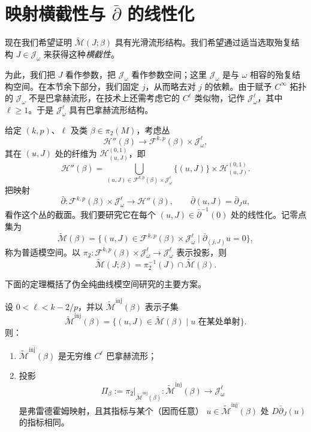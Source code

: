 \section{\texorpdfstring{映射横截性与 $\bar\partial$ 的线性化}{映射横截性与柯西--黎曼算子的线性化}}
\label{sec:mapping-transversality-linearization}
\setcounter{equation}{6}

现在我们希望证明 $\widetilde{\mathcal M}(J;\beta)$ 具有光滑流形结构。我们希望通过适当选取殆复结构
$J\in\mathcal J_\omega$ 来获得这种\emph{横截性}。

为此，我们把 $J$ 看作参数，把 $\mathcal J_\omega$ 看作参数空间；这里
$\mathcal J_\omega$ 是与 $\omega$ 相容的殆复结构空间。在本节余下部分，我们固定 $j$，从而略去对
$j$ 的依赖。由于赋予 $C^\infty$ 拓扑的 $\mathcal J_\omega$ 不是巴拿赫流形，在技术上还需考虑它的
$C^\ell$ 类似物，记作 $\mathcal J_\omega^\ell$，其中 $\ell\geq1$。于是
$\mathcal J_\omega^\ell$ 具有巴拿赫流形结构。

给定 $(k,p)$、$\ell$ 及类 $\beta\in\pi_2(M)$，考虑丛
\[
 \mathcal H''(\beta)\longrightarrow
 \mathcal F^{k,p}(\beta)\times\mathcal J_\omega^\ell,
\]
其在 $(u,J)$ 处的纤维为 $\mathcal H_{(u,J)}^{(0,1)}$，即
\[
 \mathcal H''(\beta)=
 \bigcup_{(u,J)\in\mathcal F^{k,p}(\beta)\times\mathcal J_\omega^\ell}
 \{(u,J)\}\times\mathcal H_{(u,J)}^{(0,1)}.
\]
把映射
\[
 \bar\partial:\mathcal F^{k,p}(\beta)\times\mathcal J_\omega^\ell
 \longrightarrow\mathcal H''(\beta),
 \qquad \bar\partial(u,J)=\bar\partial_Ju,
\]
看作这个丛的截面。我们要研究它在每个
$(u,J)\in\bar\partial^{-1}(0)$ 处的线性化。记零点集为
\[
 \widetilde{\mathcal M}(\beta)=
 \{(u,J)\in\mathcal F^{k,p}(\beta)\times\mathcal J_\omega^\ell
 \mid \bar\partial_{(j,J)}u=0\},
\]
称为普适模空间。以
$\pi_2:\mathcal F^{k,p}(\beta)\times\mathcal J_\omega^\ell
\to\mathcal J_\omega^\ell$ 表示投影，则
\[
 \widetilde{\mathcal M}(J;\beta)=\pi_2^{-1}(J)\cap
 \widetilde{\mathcal M}(\beta).
\]

下面的定理概括了伪全纯曲线模空间研究的主要方案。

\begin{theorem}\label{thm:mapping-transversality-main}
设 $0<\ell<k-2/p$，并以
$\widetilde{\mathcal M}^{\mathrm{inj}}(\beta)$ 表示子集
\[
 \widetilde{\mathcal M}^{\mathrm{inj}}(\beta)=
 \{(u,J)\in\widetilde{\mathcal M}(\beta)
 \mid u\text{ 在某处单射}\}.
\]
则：
\begin{enumerate}[label=(\arabic*)]
 \item $\widetilde{\mathcal M}^{\mathrm{inj}}(\beta)$ 是无穷维 $C^\ell$ 巴拿赫流形；
 \item 投影
 \[
  \Pi_\beta:=\left.\pi_2\right|_{\widetilde{\mathcal M}^{\mathrm{inj}}(\beta)}:
  \widetilde{\mathcal M}^{\mathrm{inj}}(\beta)\longrightarrow\mathcal J_\omega^\ell
 \]
 是弗雷德霍姆映射，且其指标与某个（因而任意）
 $u\in\widetilde{\mathcal M}^{\mathrm{inj}}(\beta)$ 处
 $D\bar\partial_J(u)$ 的指标相同。
\end{enumerate}
\end{theorem}

